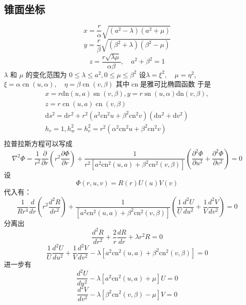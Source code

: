 \documentclass[a4paper]{ctexart}
\begin{document}
\subsection{锥面坐标}
\[
    x=\frac{r}{\alpha} \sqrt{\left(a^{2}-\lambda\right)\left(a^{2}+\mu\right)}
\]
\[
    y=\frac{r}{\beta} \sqrt{\left(\beta^{2}+\lambda\right)\left(\beta^{2}-\mu\right)}
\]
\[
    z=\frac{r \sqrt{\lambda \mu}}{\alpha \beta}, \quad a^{2}+\beta^{2}=1
\]
$\lambda$ 和 $\mu$ 的变化范围为 $0 \leqslant \lambda \leqslant a^{2}, 0 \leqslant \mu \leqslant \beta^{2}$
设$\lambda=\xi^{2}, \quad \mu=\eta^{2}$,$\xi=\alpha \operatorname{cn}(u, \alpha), \quad \eta=\beta \operatorname{cn}(v, \beta)$
其中$\operatorname{cn}$是雅可比椭圆函数
于是
$$\begin{array}{c}
        x=r \mathrm{dn}(u, a) \operatorname{sn}(v, \beta), y=r \operatorname{sn}(u, \alpha) \mathrm{dn}(v, \beta),                                            \\
        z=r \operatorname{cn}(u, a) \operatorname{cn}(v, \beta)                                                                                               \\
        \mathrm{d} s^{2}=\mathrm{d} r^{2}+r^{2}\left(a^{2} \mathrm{cn}^{2} u+\beta^{2} \mathrm{cn}^{2} v\right)\left(\mathrm{d} u^{2}+\mathrm{d} v^{2}\right) \\
        h_{r}=1, h_{w}^{2}=h_{v}^{2}=r^{2}\left(\alpha^{2} \mathrm{cn}^{2} u+\beta^{2} \mathrm{cn}^{2} v\right)                                               \\
    \end{array}
$$
拉普拉斯方程可以写成
$$
    \nabla^{2} \Phi=\frac{1}{r^{2}} \frac{\partial}{\partial r}\left(r^{2} \frac{\partial \Phi}{\partial r}\right)+\frac{1}{r^{2}\left[a^{2} \mathrm{cn}^{2}(u, a)+\beta^{2} \mathrm{cn}^{2}(v, \beta)\right]}\left(\frac{\partial^{2} \Phi}{\partial u^{2}}+\frac{\partial^{2} \Phi}{\partial v^{2}}\right)=0
$$
设
$$
    \Phi \left( r,u,v \right) =R\left( r \right) U\left( u \right) V\left( v \right)
$$
代入有：
$$
    \frac{1}{Rr^4}\frac{d}{dr}\left( r^2\frac{d^2R}{dr^2} \right) +\frac{1}{\left[ a^2\text{cn}^2\left( u,a \right) +\beta ^2\text{cn}^2\left( v,\beta \right) \right]}\left( \frac{1}{U}\frac{d^2U}{du^2}+\frac{1}{V}\frac{d^2V}{dv^2} \right) =0
$$
分离出
\begin{equation}
    \frac{d^2R}{dr^2}+\frac{2}{r}\frac{dR}{dr}+\lambda r^2R=0
\end{equation}
$$
    \frac{1}{U}\frac{d^2U}{du^2}+\frac{1}{V}\frac{d^2V}{dv^2}-\lambda \left[ a^2\text{cn}^2\left( u,a \right) +\beta ^2\text{cn}^2\left( v,\beta \right) \right] =0
$$
进一步有
\begin{equation}
    \frac{d^2U}{du^2}-\lambda \left[ a^2\text{cn}^2\left( u,a \right) +\mu \right] U=0
\end{equation}
\begin{equation}
    \frac{d^2V}{dv^2}-\lambda \left[ \beta ^2\text{cn}^2\left( v,\beta \right) -\mu \right] V=0
\end{equation}
\end{document}
